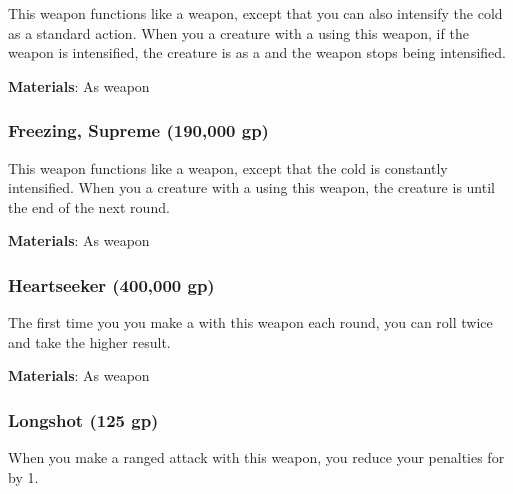 This weapon functions like a  weapon, except that you can also intensify the cold as a standard action.
When you  a creature with a  using this weapon, if the weapon is intensified,
the creature is \chilled as a  and the weapon stops being intensified.



\vspace{0.25em}
\textbf{Materials}: As weapon


\lowercase{\hypertarget{item:Freezing, Supreme}{}}\label{item:Freezing, Supreme}
\hypertarget{item:Freezing, Supreme}{\subsubsection{Freezing, Supreme\hfill{} (190,000 gp)}}

This weapon functions like a  weapon, except that the cold is constantly intensified.
When you  a creature with a  using this weapon,
the creature is \chilled until the end of the next round.



\vspace{0.25em}
\textbf{Materials}: As weapon


\lowercase{\hypertarget{item:Heartseeker}{}}\label{item:Heartseeker}
\hypertarget{item:Heartseeker}{\subsubsection{Heartseeker\hfill{} (400,000 gp)}}

The first time you you make a  with this weapon each round, you can roll twice and take the higher result.



\vspace{0.25em}
\textbf{Materials}: As weapon


\lowercase{\hypertarget{item:Longshot}{}}\label{item:Longshot}
\hypertarget{item:Longshot}{\subsubsection{Longshot\hfill{} (125 gp)}}

When you make a ranged attack with this weapon, you reduce your penalties for  by 1.



